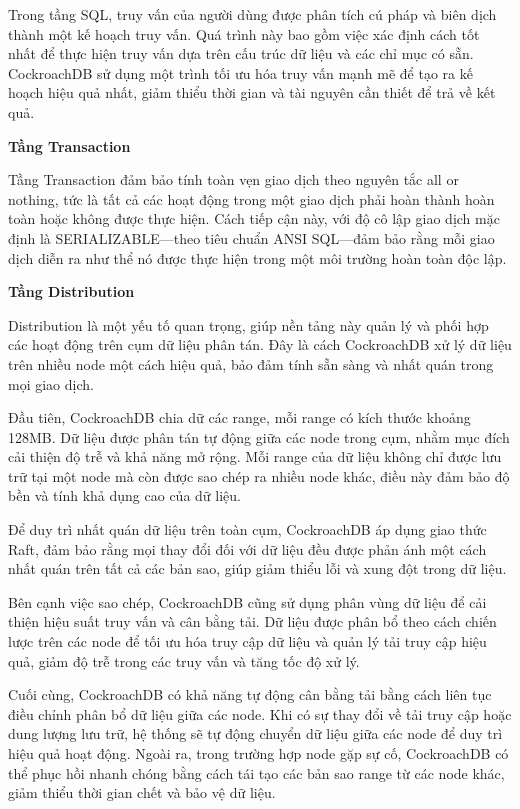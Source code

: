 \documentclass[50pt]{extarticle}
\begin{document}
Trong tầng SQL, truy vấn của người dùng được phân tích cú pháp và biên dịch thành một kế hoạch truy vấn. Quá trình này bao gồm việc xác định cách tốt nhất để thực hiện truy vấn dựa trên cấu trúc dữ liệu và các chỉ mục có sẵn. CockroachDB sử dụng một trình tối ưu hóa truy vấn mạnh mẽ để tạo ra kế hoạch hiệu quả nhất, giảm thiểu thời gian và tài nguyên cần thiết để trả về kết quả.


\textbf{Tầng Transaction}

Tầng Transaction đảm bảo tính toàn vẹn giao dịch theo nguyên tắc all or nothing, tức là tất cả các hoạt động trong một giao dịch phải hoàn thành hoàn toàn hoặc không được thực hiện. Cách tiếp cận này, với độ cô lập giao dịch mặc định là SERIALIZABLE—theo tiêu chuẩn ANSI SQL—đảm bảo rằng mỗi giao dịch diễn ra như thể nó được thực hiện trong một môi trường hoàn toàn độc lập.

\textbf{Tầng Distribution}

Distribution là một yếu tố quan trọng, giúp nền tảng này quản lý và phối hợp các hoạt động trên cụm dữ liệu phân tán. Đây là cách CockroachDB xử lý dữ liệu trên nhiều node một cách hiệu quả, bảo đảm tính sẵn sàng và nhất quán trong mọi giao dịch.

Đầu tiên, CockroachDB chia dữ các range, mỗi range có kích thước khoảng 128MB. Dữ liệu được phân tán tự động giữa các node trong cụm, nhằm mục đích cải thiện độ trễ và khả năng mở rộng. Mỗi range của dữ liệu không chỉ được lưu trữ tại một node mà còn được sao chép ra nhiều node khác, điều này đảm bảo độ bền và tính khả dụng cao của dữ liệu.

Để duy trì nhất quán dữ liệu trên toàn cụm, CockroachDB áp dụng giao thức Raft, đảm bảo rằng mọi thay đổi đối với dữ liệu đều được phản ánh một cách nhất quán trên tất cả các bản sao, giúp giảm thiểu lỗi và xung đột trong dữ liệu.

Bên cạnh việc sao chép, CockroachDB cũng sử dụng phân vùng dữ liệu để cải thiện hiệu suất truy vấn và cân bằng tải. Dữ liệu được phân bổ theo cách chiến lược trên các node để tối ưu hóa truy cập dữ liệu và quản lý tải truy cập hiệu quả, giảm độ trễ trong các truy vấn và tăng tốc độ xử lý.

Cuối cùng, CockroachDB có khả năng tự động cân bằng tải bằng cách liên tục điều chỉnh phân bổ dữ liệu giữa các node. Khi có sự thay đổi về tải truy cập hoặc dung lượng lưu trữ, hệ thống sẽ tự động chuyển dữ liệu giữa các node để duy trì hiệu quả hoạt động. Ngoài ra, trong trường hợp node gặp sự cố, CockroachDB có thể phục hồi nhanh chóng bằng cách tái tạo các bản sao range từ các node khác, giảm thiểu thời gian chết và bảo vệ dữ liệu.
\end{document}
